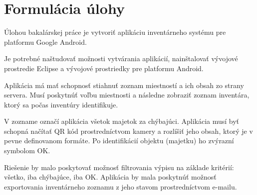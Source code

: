 \section{Formul\'acia \'ulohy}
Úlohou bakalárskej práce je vytvoriť aplikáciu inventárneho systému pre platformu Google Android.

Je potrebné naštudovať možnosti vytvárania aplikácií, nainštalovať vývojové prostredie Eclipse a vývojové prostriedky pre platformu Android.

Aplikácia má mať schopnosť stiahnuť zoznam miestností a ich obsah zo strany servera. Musí poskytnúť voľbu miestnosti a následne zobraziť zoznam inventára, ktorý sa počas inventúry identifikuje. 

V zozname označí aplikácia všetok majetok za chýbajúci. Aplikácia musí byť schopná načítať QR kód prostredníctvom kamery a rozlíšiť jeho obsah, ktorý je v pevne definovanom formáte. Po identifikácií objektu (majetku) ho zvýrazní symbolom OK.

Riešenie by malo poskytovať možnosť filtrovania výpisu na základe kritérií: všetko, iba chýbajúce, iba OK. 
Aplikácia by mala poskytnúť možnosť exportovania inventárneho zoznamu z jeho stavom prostredníctvom e-mailu.
